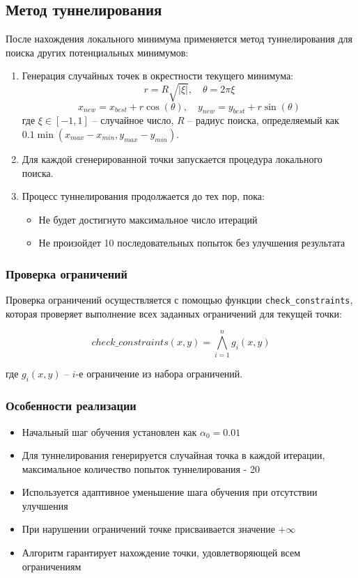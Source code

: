 \documentclass[12pt]{article}
\begin{document}
\subsection{Метод туннелирования}
После нахождения локального минимума применяется метод туннелирования для поиска других потенциальных минимумов:

\begin{enumerate}
    \item Генерация случайных точек в окрестности текущего минимума:
    \[
        r = R\sqrt{|\xi|}, \quad \theta = 2\pi\xi
    \]
    \[
        x_{new} = x_{best} + r\cos(\theta), \quad y_{new} = y_{best} + r\sin(\theta)
    \]
    где $\xi \in [-1, 1]$ -- случайное число, $R$ -- радиус поиска, определяемый как $0.1\min(x_{max}-x_{min}, y_{max}-y_{min})$.

    \item Для каждой сгенерированной точки запускается процедура локального поиска.
    
    \item Процесс туннелирования продолжается до тех пор, пока:
    \begin{itemize}
        \item Не будет достигнуто максимальное число итераций
        \item Не произойдет 10 последовательных попыток без улучшения результата
    \end{itemize}
\end{enumerate}

\subsubsection{Проверка ограничений}
Проверка ограничений осуществляется с помощью функции \texttt{check\_constraints}, которая проверяет выполнение всех заданных ограничений для текущей точки:

\[
    check\_constraints(x, y) = \bigwedge_{i=1}^n g_i(x, y)
\]

где $g_i(x, y)$ -- $i$-е ограничение из набора ограничений.

\subsubsection{Особенности реализации}
\begin{itemize}
    \item Начальный шаг обучения установлен как $\alpha_0 = 0.01$
    \item Для туннелирования генерируется случайная точка в каждой итерации, максимальное количество попыток туннелирования - 20
    \item Используется адаптивное уменьшение шага обучения при отсутствии улучшения
    \item При нарушении ограничений точке присваивается значение $+\infty$
    \item Алгоритм гарантирует нахождение точки, удовлетворяющей всем ограничениям
\end{itemize}
\newpage
\end{document}

